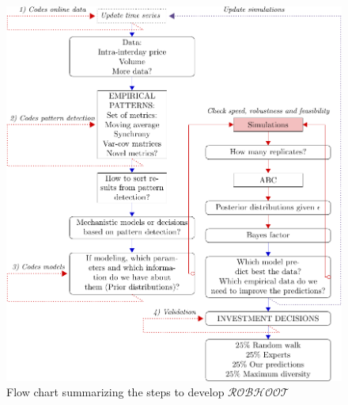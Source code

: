 \documentclass[english,12pt]{article}
\begin{document}


\begin{figure}
\vspace{-1 in}
\begin{center}
\includegraphics[scale=0.8]{EasyFlowChart.pdf}
\end{center}
\caption{Flow chart summarizing the steps to develop $\mathcal{ROBHOOT}$}
\end{figure}
\newpage
\end{document}
